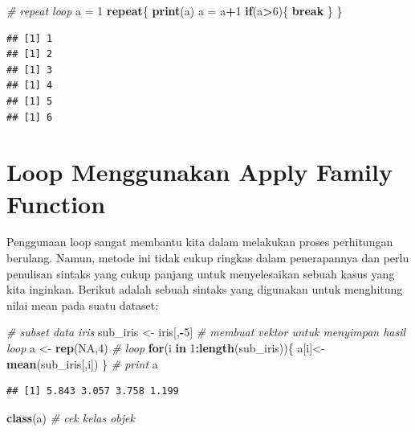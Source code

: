 \documentclass[
]{book}
\newenvironment{Shaded}{\begin{snugshade}}{\end{snugshade}}
\newcommand{\CommentTok}[1]{\textcolor[rgb]{0.56,0.35,0.01}{\textit{#1}}}
\newcommand{\ConstantTok}[1]{\textcolor[rgb]{0.56,0.35,0.01}{#1}}
\newcommand{\ControlFlowTok}[1]{\textcolor[rgb]{0.13,0.29,0.53}{\textbf{#1}}}
\newcommand{\DecValTok}[1]{\textcolor[rgb]{0.00,0.00,0.81}{#1}}
\newcommand{\FunctionTok}[1]{\textcolor[rgb]{0.13,0.29,0.53}{\textbf{#1}}}
\newcommand{\NormalTok}[1]{#1}
\newcommand{\OtherTok}[1]{\textcolor[rgb]{0.56,0.35,0.01}{#1}}
\newcommand{\SpecialCharTok}[1]{\textcolor[rgb]{0.81,0.36,0.00}{\textbf{#1}}}
\theoremstyle{definition}
\theoremstyle{definition}
\theoremstyle{definition}
\theoremstyle{definition}
\theoremstyle{remark}
\begin{document}
\begin{Shaded}
\begin{Highlighting}[]
\CommentTok{\# repeat loop}
\NormalTok{a }\OtherTok{=} \DecValTok{1}
\ControlFlowTok{repeat}\NormalTok{\{}
  \FunctionTok{print}\NormalTok{(a)}
\NormalTok{  a }\OtherTok{=}\NormalTok{ a}\SpecialCharTok{+}\DecValTok{1}
  \ControlFlowTok{if}\NormalTok{(a}\SpecialCharTok{\textgreater{}}\DecValTok{6}\NormalTok{)\{}
    \ControlFlowTok{break}
\NormalTok{  \}}
\NormalTok{\}}
\end{Highlighting}
\end{Shaded}

\begin{verbatim}
## [1] 1
## [1] 2
## [1] 3
## [1] 4
## [1] 5
## [1] 6
\end{verbatim}

\hypertarget{loopapply}{%
\section{Loop Menggunakan Apply Family Function}\label{loopapply}}

Penggunaan loop sangat membantu kita dalam melakukan proses perhitungan berulang. Namun, metode ini tidak cukup ringkas dalam penerapannya dan perlu penulisan sintaks yang cukup panjang untuk menyelesaikan sebuah kasus yang kita inginkan. Berikut adalah sebuah sintaks yang digunakan untuk menghitung nilai mean pada suatu dataset:

\begin{Shaded}
\begin{Highlighting}[]
\CommentTok{\# subset data iris}
\NormalTok{sub\_iris }\OtherTok{\textless{}{-}}\NormalTok{ iris[,}\SpecialCharTok{{-}}\DecValTok{5}\NormalTok{]}
\CommentTok{\# membuat vektor untuk menyimpan hasil loop}
\NormalTok{a }\OtherTok{\textless{}{-}} \FunctionTok{rep}\NormalTok{(}\ConstantTok{NA}\NormalTok{,}\DecValTok{4}\NormalTok{)}
\CommentTok{\# loop}
\ControlFlowTok{for}\NormalTok{(i }\ControlFlowTok{in} \DecValTok{1}\SpecialCharTok{:}\FunctionTok{length}\NormalTok{(sub\_iris))\{}
\NormalTok{  a[i]}\OtherTok{\textless{}{-}}\FunctionTok{mean}\NormalTok{(sub\_iris[,i])}
\NormalTok{\}}
\CommentTok{\# print}
\NormalTok{a}
\end{Highlighting}
\end{Shaded}

\begin{verbatim}
## [1] 5.843 3.057 3.758 1.199
\end{verbatim}

\begin{Shaded}
\begin{Highlighting}[]
\FunctionTok{class}\NormalTok{(a) }\CommentTok{\# cek kelas objek}
\end{Highlighting}
\end{Shaded}
\end{document}
